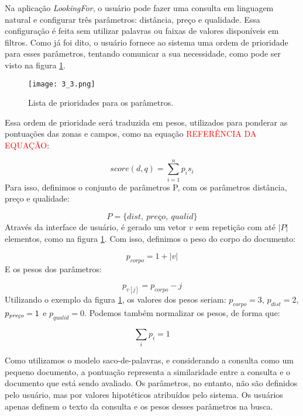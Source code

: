 Na aplicação \emph{LookingFor}, o usuário pode fazer uma consulta em linguagem natural e configurar três parâmetros: distância, preço e qualidade. Essa configuração é feita sem utilizar palavras ou faixas de valores disponíveis em filtros. Como já foi dito, o usuário fornece ao sistema uma ordem de prioridade para esses parâmetros, tentando comunicar a sua necessidade, como pode ser visto na figura \ref{fig:listprior}. 

\begin{figure}[!h]
  \centering
  \texttt{[image: 3\_3.png]} 
  \caption{Lista de prioridades para os parâmetros.}
  \label{fig:listprior} 
\end{figure}

Essa ordem de prioridade será traduzida em pesos, utilizados para ponderar as pontuações das zonas e campos, como na equação \textcolor{red}{REFERÊNCIA DA EQUAÇÃO}:

\begin{displaymath}
	score(d, q) = \sum_{i = 1}^n p_{i} s_{i}
\end{displaymath}
%
Para isso, definimos o conjunto de parâmetros P, com os parâmetros distância, preço e qualidade:

\begin{displaymath}
	P = \{dist,\ \textit{pre\c{c}o}, \ qualid\}
\end{displaymath}
%
Através da interface de usuário, é gerado um vetor $v$ sem repetição com até $|P|$ elementos, como na figura \ref{fig:listprior}. Com isso, definimos o peso do corpo do documento:

\begin{displaymath}
	p_{corpo} = 1 + |v|
\end{displaymath}
%
E os pesos dos parâmetros:

\begin{displaymath}
	p_{v[j]} = p_{corpo} - j
\end{displaymath}
%
Utilizando o exemplo da figura \ref{fig:listprior}, os valores dos pesos seriam: $p_{corpo}=3$, $p_{dist}=2$, $p_{\textit{\scriptsize pre\c{c}o}}=1$ e $p_{qualid}=0$. Podemos também normalizar os pesos, de forma que:

\begin{displaymath}
	\sum_{i} p_{i} = 1
\end{displaymath}

Como utilizamos o modelo saco-de-palavras, e considerando a consulta como um pequeno documento, a pontuação representa a similaridade entre a consulta e o documento que está sendo avaliado. Os parâmetros, no entanto, não são definidos pelo usuário, mas por valores hipotéticos atribuídos pelo sistema. Os usuários apenas definem o texto da consulta e os pesos desses parâmetros na busca.

